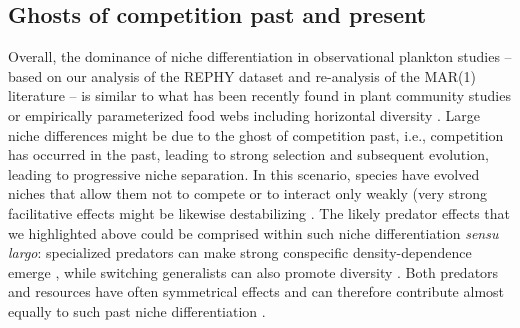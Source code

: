 \documentclass[10pt]{article}
\begin{document}
\subsection*{Ghosts of competition past and present}

Overall, the dominance of niche differentiation in observational plankton
studies -- based on our analysis of the REPHY dataset and re-analysis
of the MAR(1) literature -- is similar to what has been recently
found in plant community studies \citep{volkov_patterns_2007,adler_competition_2018}
or empirically parameterized food webs including horizontal diversity
\citep{barabas_self-regulation_2017}. Large niche differences might
be due to the ghost of competition past, i.e., competition has
occurred in the past, leading to strong selection and subsequent evolution, leading to progressive niche separation. In this scenario, species
have evolved niches that allow them not to compete or to interact
only weakly (very strong facilitative effects might be likewise destabilizing
\citep{coyte_ecology_2015}. The likely predator effects that we highlighted
above could be comprised within such niche differentiation \emph{sensu
largo}: specialized predators can make strong conspecific density-dependence
emerge \citep{bagchi_pathogens_2014,comita_testing_2014}, while switching
generalists can also promote diversity \citep{vallina2014maximal}.
Both predators and resources have often symmetrical effects and can
therefore contribute almost equally to such past niche differentiation
\citep{chesson_updates_2018}.
\end{document}
